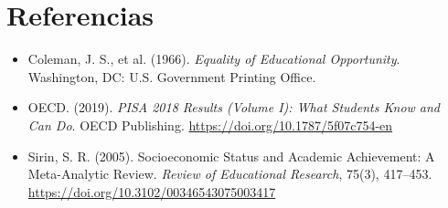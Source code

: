 \documentclass[12pt]{article}
\begin{document}
\section*{Referencias}
\begin{itemize}
    \item Coleman, J. S., et al. (1966). \textit{Equality of Educational Opportunity}. Washington, DC: U.S. Government Printing Office.
    \item OECD. (2019). \textit{PISA 2018 Results (Volume I): What Students Know and Can Do}. OECD Publishing. \url{https://doi.org/10.1787/5f07c754-en}
    \item Sirin, S. R. (2005). Socioeconomic Status and Academic Achievement: A Meta-Analytic Review. \textit{Review of Educational Research}, 75(3), 417–453. \url{https://doi.org/10.3102/00346543075003417}
\end{itemize}
\end{document}
